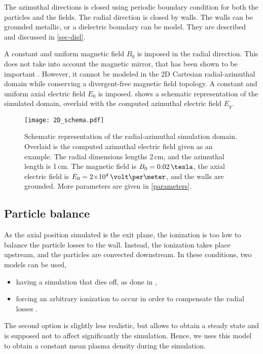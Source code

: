 The azimuthal directions is closed using periodic boundary condition for both the particles and the fields.
The radial direction is closed by walls.
The walls can be grounded metallic, or a dielectric boundary can be model.
They are described and discussed in \cref{sec-diel}.

A constant and uniform magnetic field $B_0$ is imposed in the radial direction.
This does not take into account the magnetic mirror, that has been shown to be important \citep{keidar2005,yu2008a,dominguez-vazquez2018}.
However, it cannot be modeled in the \ac{2D} Cartesian radial-azimuthal domain while conserving a divergent-free magnetic field topology.
A constant and uniform axial electric field $E_0$ is imposed.
 shows a schematic representation of the simulated domain, overlaid with the computed azimuthal electric field $E_y$.

\begin{figure}[hbtp]
  \centering
  \texttt{[image: 2D\_schema.pdf]}
  \caption{Schematic representation of the radial-azimuthal simulation domain. Overlaid is the computed azimuthal electric field given as an example. The radial dimensions lengths 2\,cm, and the azimuthal length is 1\,cm.
  The magnetic field is $B_0=0.02\,\tesla$, the axial electric field is $E_0=\sn{2}{4}\,\volt\per\meter$, and the walls are grounded. More parameters are given in \cref{parameters}.}
  \label{fig-2dschemat}
\end{figure}

\subsection{Particle balance}
As the axial position simulated is the exit plane, the ionization is too low to balance the particle losses to the wall.
Instead, the ionization takes place upstream, and the particles are convected downstream.
In these conditions, two models can be used,
\begin{itemize}
  \item having a simulation that dies off, as done in \citet{janhunen2018},
  \item forcing an arbitrary ionization to occur in order to compensate the radial losses \citep{dominguez-vazquez2018}.
\end{itemize}
The second option is slightly less realistic, but allows to obtain a steady state and is supposed not to affect significantly the simulation.
Hence, we uses this model to obtain a constant mean plasma density during the simulation.

